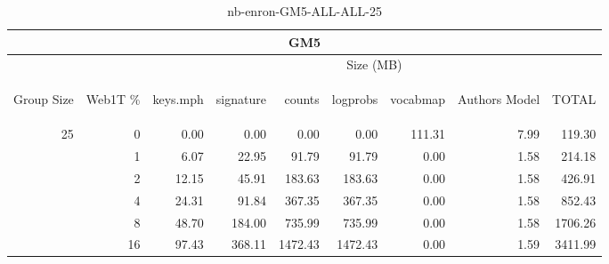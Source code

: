 \begin{center}
\begin{table}[htbp] 
 \begin{center}
\begin{tabular}{ | r | r | r | r | r | r | r | r | r |}
\hline
\multicolumn{9}{|c|}{GM5}\\
\hline
 & & \multicolumn{7}{|c|}{Size (MB)}\\ \cline{3-9}
\begin{sideways}Group Size\end{sideways} & \begin{sideways}Web1T \% \end{sideways} & \begin{sideways}keys.mph\end{sideways} & \begin{sideways}signature\end{sideways} & \begin{sideways}counts\end{sideways} & \begin{sideways}logprobs\end{sideways} & \begin{sideways}vocabmap\end{sideways} & \begin{sideways}Authors Model \end{sideways} & \begin{sideways}TOTAL\end{sideways}\\
\hline
\multirow{5}{*}{25}
 & 0 & 0.00 & 0.00 & 0.00 & 0.00 & 111.31 & 7.99 & 119.30\\ \cline{2-9}
 & 1 & 6.07 & 22.95 & 91.79 & 91.79 & 0.00 & 1.58 & 214.18\\ \cline{2-9}
 & 2 & 12.15 & 45.91 & 183.63 & 183.63 & 0.00 & 1.58 & 426.91\\ \cline{2-9}
 & 4 & 24.31 & 91.84 & 367.35 & 367.35 & 0.00 & 1.58 & 852.43\\ \cline{2-9}
 & 8 & 48.70 & 184.00 & 735.99 & 735.99 & 0.00 & 1.58 & 1706.26\\ \cline{2-9}
 & 16 & 97.43 & 368.11 & 1472.43 & 1472.43 & 0.00 & 1.59 & 3411.99\\ \cline{2-9}
\hline
\end{tabular}
\caption{nb-enron-GM5-ALL-ALL-25}
\label{table:nb-enron-GM5-ALL-ALL-25}
\end{center}
 \end{table}
\end{center}

